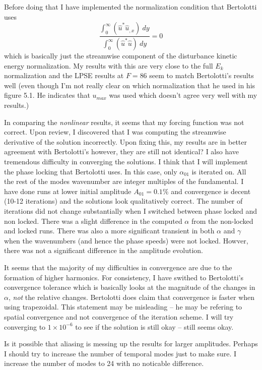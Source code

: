 \documentclass[12pt]{article}
\begin{document}
Before doing that I have implemented the normalization condition that
Bertolotti uses
%
\begin{equation}
  \frac{ \int_0^\infty \left( \hat u^* \hat u_{,x}  \right) \ dy }
       { \int_0^\infty \left( \hat u^* \hat u  \right) \ dy} = 0
\end{equation}
%
which is basically just the streamwise component of the disturbance kinetic
energy normalization.  My results with this are very close to the full $E_k$
normalization and the LPSE results at $F=86$ seem to match Bertolotti's
results well (even though I'm not really clear on which normalization that he
used in his figure 5.1.  He indicates that $u_{max}$ was used which doesn't
agree very well with my results.)

In comparing the {\em nonlinear} results, it seems that my forcing function
was not correct.  Upon review, I discovered that I was computing the
streamwise derivative of the solution incorrectly.  Upon fixing this, my
results are in better agreement with Bertolotti's however, they are still not
identical?  I also have tremendous difficulty in converging the solutions.  I
think that I will implement the phase locking that Bertolotti uses.  In this
case, only $\alpha_{01}$ is iterated on.  All the rest of the modes wavenumber
are integer multiples of the fundamental.  I have done runs at lower initial
amplitude $A_{01} = 0.1\%$ and convergence is decent (10-12 iterations) and
the solutions look qualitatively correct.  The number of iterations did not
change substantially when I switched between phase locked and non locked.
There was a slight difference in the computed $\alpha$ from the non-locked and
locked runs.  There was also a more significant transient in both $\alpha$ and
$\gamma$ when the wavenumbers (and hence the phase speeds) were not locked.
Howver, there was not a significant difference in the amplitude evolution.

It seems that the majority of my difficulties in convergence are due to the
formation of higher harmonics.  For consistency, I have swithed to
Bertolotti's convergence tolerance which is basically looks at the magnitude
of the changes in $\alpha$, {\em not} the relative changes.  Bertolotti does
claim that convergence is faster when using trapezoidal.  This statement may
be misleading -- he may be refering to spatial convergence and not convergence
of the iteration scheme.  I will try converging to $1\times 10^{-6}$ to see if
the solution is still okay -- still seems okay.

Is it possible that aliasing is messing up the results for larger amplitudes.
Perhaps I should try to increase the number of temporal modes just to make
sure.  I increase the number of modes to 24 with no noticable difference.
\end{document}
